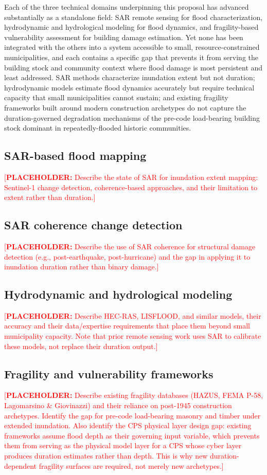 \documentclass[11pt]{article}
\newcommand{\placeholder}[1]{\textcolor{red}{[\textbf{PLACEHOLDER:} #1]}}
\begin{document}
Each of the three technical domains underpinning this proposal has advanced substantially as a standalone field: SAR remote sensing for flood characterization, hydrodynamic and hydrological modeling for flood dynamics, and fragility-based vulnerability assessment for building damage estimation. 
Yet none has been integrated with the others into a system accessible to small, resource-constrained municipalities, and each contains a specific gap that prevents it from serving the building stock and community context where flood damage is most persistent and least addressed. 
SAR methods characterize inundation extent but not duration; hydrodynamic models estimate flood dynamics accurately but require technical capacity that small municipalities cannot sustain; and existing fragility frameworks built around modern construction archetypes do not capture the duration-governed degradation mechanisms of the pre-code load-bearing building stock dominant in repeatedly-flooded historic communities.

\subsection{SAR-based flood mapping}
\placeholder{Describe the state of SAR for inundation extent mapping: Sentinel-1 change detection, coherence-based approaches, and their limitation to extent rather than duration.}

\subsection{SAR coherence change detection}
\placeholder{Describe the use of SAR coherence for structural damage detection (e.g., post-earthquake, post-hurricane) and the gap in applying it to inundation duration rather than binary damage.}

\subsection{Hydrodynamic and hydrological modeling}
\placeholder{Describe HEC-RAS, LISFLOOD, and similar models, their accuracy and their data/expertise requirements that place them beyond small municipality capacity.  Note that prior remote sensing work uses SAR to calibrate these models, not replace their duration output.}

\subsection{Fragility and vulnerability frameworks}
\placeholder{Describe existing fragility databases (HAZUS, FEMA P-58, Lagomarsino \& Giovinazzi) and their reliance on post-1945 construction archetypes. Identify the gap for pre-code load-bearing masonry and timber under extended inundation. Also identify the CPS physical layer design gap: existing frameworks assume flood depth as their governing input variable, which prevents them from serving as the physical model layer for a CPS whose cyber layer produces duration estimates rather than depth. This is why new duration-dependent fragility surfaces are required, not merely new archetypes.}
\end{document}
